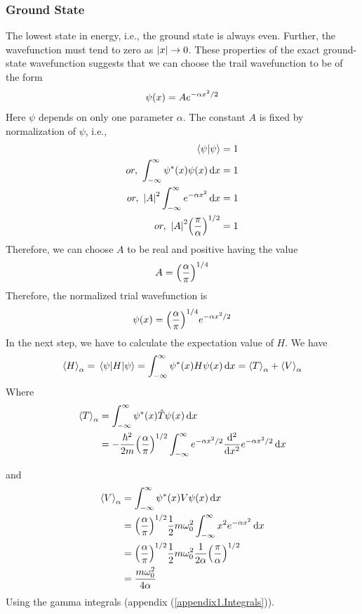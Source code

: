 	\subsubsection{Ground State}
	
	 The lowest state in energy, i.e., the ground state is always even. Further, the wavefunction must tend to zero as $\abs{x} \rightarrow 0 $. These properties of the exact ground-state wavefunction suggests that we can choose the trail wavefunction to be of the form
	\begin{equation*}
		\psi\qty(x) = A e ^{-\alpha x^2 / 2}
	\end{equation*}
	Here $\psi$ depends on only one parameter $\alpha$. The constant $A$ is fixed by normalization of $\psi$, i.e.,
	\begin{align*}
		\braket{\psi}{\psi} &= 1 \\
		or, \ \int_{-\infty}^{\infty} \psi^*\qty(x) \psi\qty(x) \dd{x} &= 1\\
		or, \ \abs{A}^2 \int_{-\infty}^{\infty} e^{-\alpha x^2} \dd{x} &= 1\\
		or, \ \abs{A}^2 \qty(\frac{\pi}{\alpha})^{1/2} &= 1
	\end{align*}
	Therefore, we can choose $A$ to be real and positive having the value
	\begin{align*}
		A = \qty(\frac{\alpha}{\pi})^{1/4}
	\end{align*}
	Therefore, the normalized trial wavefunction is 
	\begin{equation*}
		\psi\qty(x) = \qty(\frac{\alpha}{\pi})^{1/4} e^{-\alpha x^2 / 2}
	\end{equation*}
	In the next step, we have to calculate the expectation value of $H$. We have
	\begin{equation*}
		\expval{H}_\alpha = \expval{H}{\psi} = \int_{-\infty}^{\infty} \psi^* \qty(x) H \psi \qty(x) \dd{x} = \expval{T}_\alpha + \expval{V}_\alpha
	\end{equation*}
	Where
	\begin{align*}
		\expval{T}_\alpha 
		&= \int_{-\infty}^{\infty} \psi^* \qty(x) \hat{T} \psi \qty(x) \dd{x} \\
		&= -\frac{\hbar^2}{2 m} \qty(\frac{\alpha}{\pi})^{1/2} \int_{-\infty}^{\infty} e^{-\alpha x^2/2} \dv[2]{}{x} e^{-\alpha x^2 / 2} \dd{x}
	\end{align*}
	
	and
	\begin{align*}
	\expval{V}_\alpha 
	&= \int_{-\infty}^{\infty} \psi^* \qty(x) V \psi \qty(x) \dd{x} \\
	&= \qty(\frac{\alpha}{\pi})^{1/2} \frac{1}{2} m \omega_0^2 \int_{-\infty}^{\infty} x^2 e^{-\alpha x^2} \dd{x} \\
	&= \qty(\frac{\alpha}{\pi})^{1/2} \frac{1}{2} m \omega_0^2 \frac{1}{2 \alpha} \qty(\frac{\pi}{\alpha})^{1/2} \\
	&= \frac{m \omega_0^2}{4 \alpha}
	\end{align*}
	Using the gamma integrals (appendix (\ref{appendix1.Integrals})).
	
